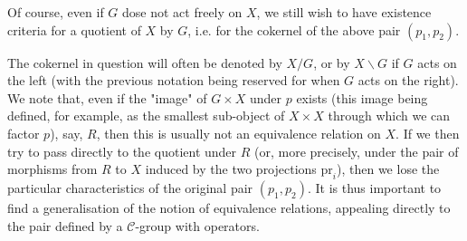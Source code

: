 Of course, even if $G$ dose not act freely on $X$, we still wish to have existence criteria for a quotient of $X$ by $G$, i.e. for the cokernel of the above pair $(p_1,p_2)$.

The cokernel in question will often be denoted by $X/G$, or by $X\backslash G$ if $G$ acts on the left (with the previous notation being reserved for when $G$ acts on the right).
We note that, even if the "image" of $G\times X$ under $p$ exists (this image being defined, for example, as the smallest sub-object of $X\times X$ through which we can factor $p$), say, $R$, then this is usually not an equivalence relation on $X$.
If we then try to pass directly to the quotient under $R$ (or, more precisely, under the pair of morphisms from $R$ to $X$ induced by the two projections $\mathrm{pr}_i$), then we lose the particular characteristics of the original pair $(p_1,p_2)$.
It is thus important to find a generalisation of the notion of equivalence relations, appealing directly to the pair defined by a $\mathcal{C}$-group with operators.
